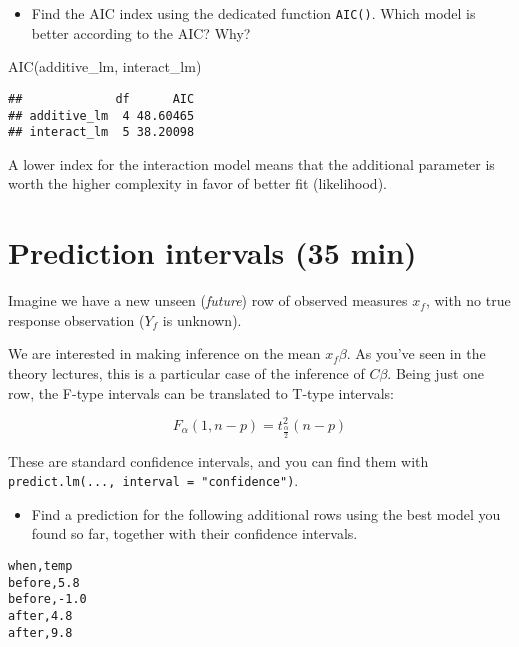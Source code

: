 \documentclass[
  oneside]{book}
\newenvironment{Shaded}{\begin{snugshade}}{\end{snugshade}}
\newcommand{\FunctionTok}[1]{\textcolor[rgb]{0.00,0.00,0.00}{#1}}
\newcommand{\NormalTok}[1]{#1}
\providecommand{\tightlist}{%
  \setlength{\itemsep}{0pt}\setlength{\parskip}{0pt}}
\begin{document}
\begin{itemize}
\tightlist
\item
  Find the AIC index using the dedicated function \texttt{AIC()}.
  Which model is better according to the AIC? Why?
\end{itemize}

\begin{Shaded}
\begin{Highlighting}[]
\FunctionTok{AIC}\NormalTok{(additive\_lm, interact\_lm)}
\end{Highlighting}
\end{Shaded}

\begin{verbatim}
##             df      AIC
## additive_lm  4 48.60465
## interact_lm  5 38.20098
\end{verbatim}

A lower index for the interaction model means that the
additional parameter is worth the higher complexity
in favor of better fit (likelihood).

\hypertarget{prediction-intervals-35-min}{%
\section{Prediction intervals (35 min)}\label{prediction-intervals-35-min}}

Imagine we have a new unseen (\emph{future}) row of observed measures \(x_f\),
with no true response observation (\(Y_f\) is unknown).

We are interested in making inference on the mean \(x_f \beta\).
As you've seen in the theory lectures, this is a particular case of the
inference of \(C \beta\). Being just one row, the F-type intervals can be
translated to T-type intervals:

\[
F_{\alpha}(1, n-p) = t^2_{\frac{\alpha}{2}}(n-p)
\]

These are standard confidence intervals, and you can find
them with \texttt{predict.lm(...,\ interval\ =\ "confidence")}.

\begin{itemize}
\tightlist
\item
  Find a prediction for the following additional rows using the best model you
  found so far, together with their confidence intervals.
\end{itemize}

\begin{verbatim}
when,temp
before,5.8
before,-1.0
after,4.8
after,9.8
\end{verbatim}
\end{document}
